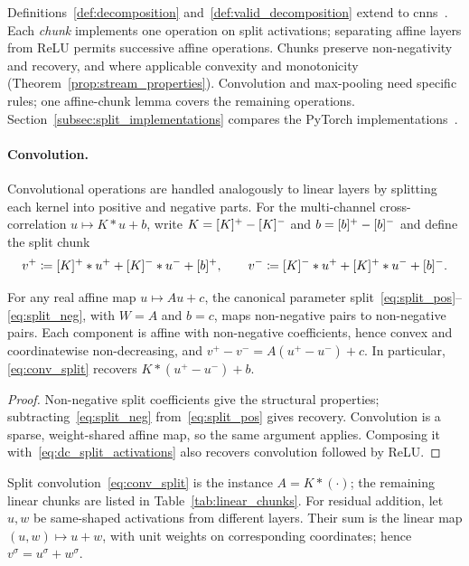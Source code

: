 Definitions~\ref{def:decomposition} and~\ref{def:valid_decomposition} extend to \acp{cnn}~\parencite{Simonyan2015,He2016resnet}. Each \emph{chunk} implements one operation on split activations; separating affine layers from ReLU permits successive affine operations. Chunks preserve non-negativity and recovery, and where applicable convexity and monotonicity (Theorem~\ref{prop:stream_properties}). Convolution and max-pooling need specific rules; one affine-chunk lemma covers the remaining operations. Section~\ref{subsec:split_implementations} compares the PyTorch implementations~\parencite{Paszke2019PyTorch}.

\paragraph{Convolution.}
Convolutional operations are handled analogously to linear layers by splitting each kernel into positive and negative parts. For the multi-channel cross-correlation $u\mapsto K*u+b$, write $K=[K]^{+}-[K]^{-}$ and $b=[b]^{+}-[b]^{-}$ and define the split chunk
\begin{equation}
	v^+ \coloneqq [K]^{+} * u^+ + [K]^{-} * u^- + [b]^{+},
	\qquad
	v^- \coloneqq [K]^{-} * u^+ + [K]^{+} * u^- + [b]^{-}.
	\label{eq:conv_split}
\end{equation}

\begin{lemmaenv}\label{lem:linear_chunk}
For any real affine map $u\mapsto Au+c$, the canonical parameter split~\eqref{eq:split_pos}--\eqref{eq:split_neg}, with $W=A$ and $b=c$, maps non-negative pairs to non-negative pairs. Each component is affine with non-negative coefficients, hence convex and coordinatewise non-decreasing, and $v^+-v^-=A(u^+-u^-)+c$. In particular, \eqref{eq:conv_split} recovers $K*(u^+-u^-)+b$.
\end{lemmaenv}
\begin{proof}
Non-negative split coefficients give the structural properties; subtracting~\eqref{eq:split_neg} from~\eqref{eq:split_pos} gives recovery. Convolution is a sparse, weight-shared affine map, so the same argument applies. Composing it with~\eqref{eq:dc_split_activations} also recovers convolution followed by ReLU.
\end{proof}

Split convolution~\eqref{eq:conv_split} is the instance $A = K*(\cdot)$; the remaining linear chunks are listed in Table~\ref{tab:linear_chunks}. For residual addition, let $u,w$ be same-shaped activations from different layers. Their sum is the linear map $(u,w)\mapsto u+w$, with unit weights on corresponding coordinates; hence $v^\sigma=u^\sigma+w^\sigma$.


